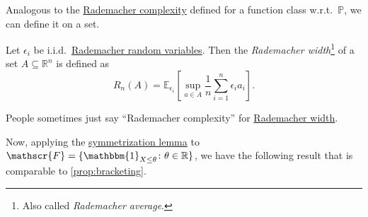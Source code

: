 Analogous to the \hyperref[def:Rademacher-complexity]{Rademacher complexity} defined for a function class w.r.t.\ \(\mathbb{P} \), we can define it on a set.

\begin{definition}\label{def:Rademacher-width}
	Let \(\epsilon _i\) be i.i.d.\ \hyperref[eg:Rademacher-random-varaible]{Rademacher random variables}. Then the \emph{Rademacher width}\footnote{Also called \emph{Rademacher average}.} of a set \(A \subseteq \mathbb{R} ^n\) is defined as
	\[
		R_n(A) = \mathbb{E}_{\epsilon _i}\left[ \sup _{a\in A} \frac{1}{n} \sum_{i=1}^{n} \epsilon _i a_i \right].
	\]
\end{definition}

\begin{notation}
	People sometimes just say ``Rademacher complexity'' for \hyperref[def:Rademacher-width]{Rademacher width}.
\end{notation}

Now, applying the \hyperref[lma:symmetrization]{symmetrization lemma} to \(\mathscr{F} = \{ \mathbbm{1}_{X \leq \theta} \colon \theta \in \mathbb{R} \} \), we have the following result that is comparable to \autoref{prop:bracketing}.

